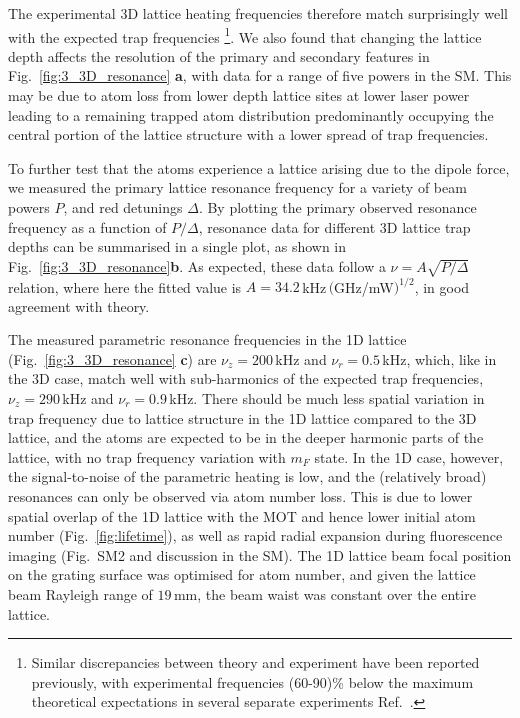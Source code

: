 \documentclass[aps,prl,floatfix,showpacs,twocolumn,amsmath,amssymb,superscriptaddress]{revtex4-2}
\begin{document}
The experimental 3D lattice heating frequencies therefore match surprisingly well with
the expected trap frequencies \footnote{Similar discrepancies between theory and experiment have been reported previously, with experimental frequencies (60-90)\% below the maximum theoretical expectations in several separate experiments Ref.~\cite{parametric_oscillation_Wu2006}.}. We also found that changing the lattice depth affects the resolution of the primary and secondary features in Fig.~\ref{fig:3_3D_resonance} \textbf{a}, with data for a range of five powers in the SM.
This may be due to atom loss from lower depth lattice sites at lower laser power leading to a remaining trapped atom distribution predominantly occupying the central portion of the lattice structure with a lower spread of trap frequencies.

To further test that the atoms experience a lattice arising due to the dipole force, we measured the primary lattice resonance frequency for a  variety of beam powers $P$, and red detunings $\Delta$.
By plotting the primary observed resonance frequency as a function of $P/\Delta$, resonance data for different 3D lattice trap depths can be summarised in a single plot, as shown in Fig.~\ref{fig:3_3D_resonance}\textbf{b}.
 As expected, these data follow a $\nu=A\sqrt{P/\Delta}$ relation, where here the fitted value is $A=34.2\,$kHz$\,($GHz/mW$)^{1/2}$, in good agreement with theory.

The measured parametric resonance frequencies in the 1D lattice (Fig.~\ref{fig:3_3D_resonance} \textbf{c}) are $\nu_{z}=200\,$kHz and $\nu_{r}=0.5\,$kHz, which, like in the 3D case, match well with sub-harmonics of the expected trap frequencies, $\nu_{z}=290\,$kHz and $\nu_{r}=0.9\,$kHz. There should be much less spatial variation in trap frequency due to lattice structure in the 1D lattice compared to the 3D lattice, and the atoms are expected to be in the deeper harmonic parts of the lattice, with no trap frequency variation with $m_F$ state. In the 1D case, however, the signal-to-noise of the parametric heating is low, and the (relatively broad) resonances can only be observed via atom number loss. This is due to lower spatial overlap of the 1D lattice with the MOT and hence lower initial atom number  (Fig.~\ref{fig:lifetime}), as well as rapid radial expansion during fluorescence imaging (Fig.~SM2 and discussion in the SM). The 1D lattice beam focal position on the grating surface was optimised for atom number, and given the lattice beam Rayleigh range of $19\,$mm, the beam waist was constant over the entire lattice.
\end{document}
